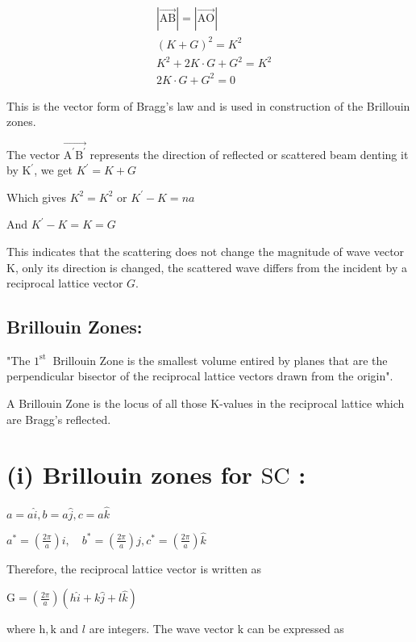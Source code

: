 $$
\begin{aligned}
&|\overrightarrow{\mathrm{AB}}|=|\overrightarrow{\mathrm{AO}}| \\
&(K+G)^{2}=K^{2} \\
&K^{2}+2 K \cdot G+G^{2}=K^{2} \\
&2 K \cdot G+G^{2}=0
\end{aligned}
$$

This is the vector form of Bragg's law and is used in construction of the Brillouin zones.

The vector $\overrightarrow{\mathrm{A}^{\prime} \mathrm{B}^{\prime}}$ represents the direction of reflected or scattered beam denting it by $\mathrm{K}^{\prime}$, we get $K^{\prime}=K+G$

Which gives $K^{2}=K^{2}$ or $K^{\prime}-K=n a$

And $K^{\prime}-K=K=G$

This indicates that the scattering does not change the magnitude of wave vector $\mathrm{K}$, only its direction is changed, the scattered wave differs from the incident by a reciprocal lattice vector $G$. 



\subsection{Brillouin Zones:}

"The $1^{\text {st }}$ Brillouin Zone is the smallest volume entired by planes that are the perpendicular bisector of the reciprocal lattice vectors drawn from the origin".

A Brillouin Zone is the locus of all those $\mathrm{K}$-values in the reciprocal lattice which are Bragg's reflected.

\section{(i) Brillouin zones for $\mathrm{SC}$ :}

$a=a \hat{i}, b=a \hat{j}, c=a \hat{k}$

$a^{*}=\left(\frac{2 \pi}{a}\right) i, \quad b^{*}=\left(\frac{2 \pi}{a}\right) j, c^{*}=\left(\frac{2 \pi}{a}\right) \hat{k}$

Therefore, the reciprocal lattice vector is written as

$\mathrm{G}=\left(\frac{2 \pi}{a}\right)(h \hat{i}+k \hat{j}+l \hat{k})$

where $\mathrm{h}, \mathrm{k}$ and $l$ are integers. The wave vector $\mathrm{k}$ can be expressed as

